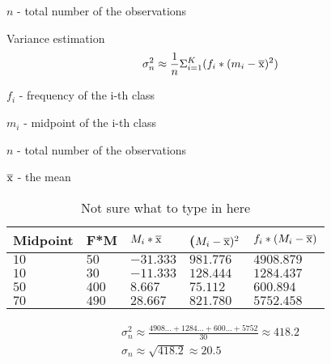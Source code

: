 \documentclass{article}
\begin{document}
$n$ - total number of the observations

Variance estimation
\begin{equation}
  \sigma^2_n \approx \frac{1}{n}\Sigma^K_{i=1}(f_i * (m_i - \overline{\rm x})^2)
\end{equation}

$f_i$ - frequency of the i-th class

$m_i$ - midpoint of the i-th class

$n$ - total number of the observations

$\overline{\rm x}$ - the mean

\begin{table}[htbp]
  \centering
  \begin{tabular}{|l|l|l|l|l|}
    \hline
    \textbf{Midpoint} & \textbf{F*M} & \textbf{$M_i * \overline{\rm x}$} & \textbf{($M_i - \overline{\rm x})^2$} & \textbf{$f_i * (M_i - \overline{\rm x})$} \\
    \hline
    $10$ & $50$ & $-31.333$ & $981.776$ & $4908.879$ \\
    \hline
    $10$ & $30$ & $-11.333$ & $128.444$ & $1284.437$ \\
    \hline
    $50$ & $400$ & $8.667$ & $75.112$ & $600.894$ \\
    \hline
    $70$ & $490$ & $28.667$ & $821.780$ & $5752.458$  \\
    \hline
  \end{tabular}
  \caption{Not sure what to type in here}
  \label{tab:estimating_a_mean_and_variance_3}
\end{table}
\begin{equation}
  \begin{gathered}
    \sigma^2_n \approx \frac{4908... + 1284... + 600... + 5752}{30} \approx 418.2  \\
    \sigma_n \approx \sqrt{418.2} \approx 20.5
  \end{gathered}
\end{equation}
\end{document}
